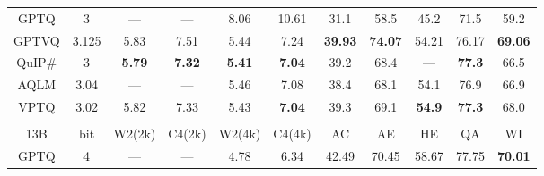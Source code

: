\begin{table}[hbt!]
{\begin{tabular}{c|c|cccc|ccccc}
GPTQ                 & 3                    & ---           & ---            & 8.06                    & 10.61                   & 31.1                & 58.5                & 45.2                & 71.5                & 59.2                \\
GPTVQ                & 3.125                & 5.83                    & 7.51                    & 5.44                    & 7.24                    & \textbf{39.93}      & \textbf{74.07}      & 54.21               & 76.17               & \textbf{69.06}      \\
QuIP\#               & 3                    & \textbf{5.79}           & \textbf{7.32}           & \textbf{5.41}           & \textbf{7.04}           & 39.2                & 68.4                & ---                   & \textbf{77.3}       & 66.5                \\
AQLM                 & 3.04                 & ---                     & ---                     & 5.46                    & 7.08                    & 38.4                & 68.1                & 54.1                & 76.9                & 66.9                \\
VPTQ                 & 3.02                 & 5.82                    & 7.33                    & 5.43                    & \textbf{7.04}           & 39.3                & 69.1                & \textbf{54.9}       & \textbf{77.3}       & 68.0                \\ \hline
                     &                      &                         &                         &                         &                         &                     &                     &                     &                     &                     \\
\multirow{2}{*}{13B} & \multirow{2}{*}{bit} & \multirow{2}{*}{W2(2k)} & \multirow{2}{*}{C4(2k)} & \multirow{2}{*}{W2(4k)} & \multirow{2}{*}{C4(4k)} & \multirow{2}{*}{AC} & \multirow{2}{*}{AE} & \multirow{2}{*}{HE} & \multirow{2}{*}{QA} & \multirow{2}{*}{WI} \\
                     &                      &                         &                         &                         &                         &                     &                     &                     &                     &                     \\ \hline
GPTQ                 & 4                    & ---                     & ---                     & 4.78                    & 6.34                    & 42.49               & 70.45               & 58.67               & 77.75               & \textbf{70.01}      \\

\end{tabular}}
\end{table}
